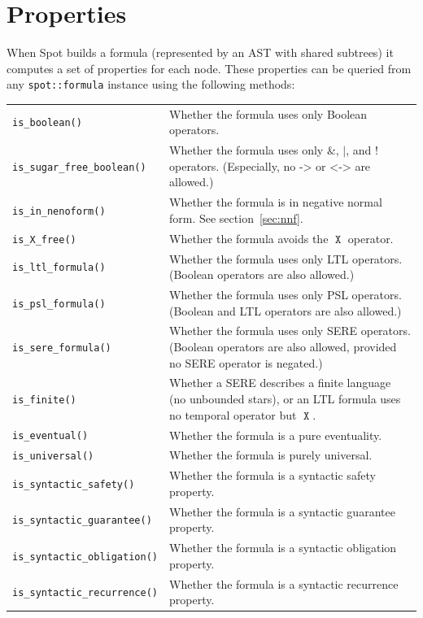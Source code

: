 \documentclass[a4paper,twoside,10pt,DIV=12]{scrreprt}
\DeclareMathOperator{\X}{\texttt{X}}
\DeclareMathOperator{\NOT}{\texttt{!}}
\newcommand{\IMPLIES}{\mathbin{\texttt{->}}}
\newcommand{\EQUIV}{\mathbin{\texttt{<->}}}
\newcommand{\OR}{\mathbin{\texttt{|}}}
\newcommand{\AND}{\mathbin{\texttt{\&}}}
\newcommand{\0}{\texttt{0}}
\newcommand{\1}{\texttt{1}}
\begin{document}
\chapter{Properties}

When Spot builds a formula (represented by an AST with shared
subtrees) it computes a set of properties for each node.  These
properties can be queried from any \texttt{spot::formula}
instance using the following methods:

\noindent
\label{property-methods}
\begin{tabulary}{.995\textwidth}{@{}lJ@{}}
\texttt{is\_boolean()}& Whether the formula uses only Boolean
  operators.
\\\texttt{is\_sugar\_free\_boolean()}& Whether the formula uses
  only $\AND$, $\OR$, and $\NOT$ operators.  (Especially, no
  $\IMPLIES$ or $\EQUIV$ are allowed.)
\\\texttt{is\_in\_nenoform()}& Whether the formula is in negative
  normal form. See section~\ref{sec:nnf}.
\\\texttt{is\_X\_free()}&
  Whether the formula avoids the $\X$ operator.
\\\texttt{is\_ltl\_formula()}& Whether the formula uses only LTL
  operators. (Boolean operators are also allowed.)
\\\texttt{is\_psl\_formula()}& Whether the formula uses only PSL
  operators. (Boolean and LTL operators are also allowed.)
\\\texttt{is\_sere\_formula()}& Whether the formula uses only
  SERE operators. (Boolean operators are also allowed, provided
  no SERE operator is negated.)
\\\texttt{is\_finite()}& Whether a SERE describes a finite
  language (no unbounded stars), or an LTL formula uses no
  temporal operator but $\X$.
\\\texttt{is\_eventual()}& Whether the formula is a pure eventuality.
\\\texttt{is\_universal()}& Whether the formula is purely universal.
\\\texttt{is\_syntactic\_safety()}& Whether the formula is a syntactic
  safety property.
\\\texttt{is\_syntactic\_guarantee()}& Whether the formula is a syntactic
  guarantee property.
\\\texttt{is\_syntactic\_obligation()}& Whether the formula is a syntactic
  obligation property.
\\\texttt{is\_syntactic\_recurrence()}& Whether the formula is a syntactic
  recurrence property.

\end{tabulary}
\end{document}
